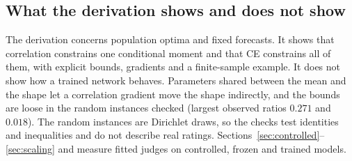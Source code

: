 \subsection{What the derivation shows and does not show}
\label{app:moments-limits}

The derivation concerns population optima and fixed forecasts.
It shows that correlation constrains one conditional moment and that CE constrains all of them, with explicit bounds, gradients and a finite-sample example.
It does not show how a trained network behaves.
Parameters shared between the mean and the shape let a correlation gradient move the shape indirectly, and the bounds are loose in the random instances checked (largest observed ratios $0.271$ and $0.018$).
The random instances are Dirichlet draws, so the checks test identities and inequalities and do not describe real ratings.
Sections~\ref{sec:controlled}--\ref{sec:scaling} and  measure fitted judges on controlled, frozen and trained models.
